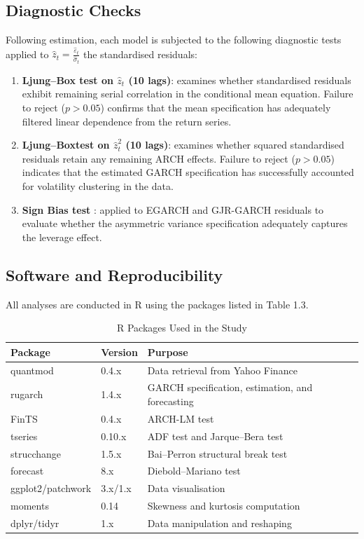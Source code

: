 \subsection{Diagnostic Checks}
Following estimation, each model is subjected to the following diagnostic tests applied to $
\hat{z}_t
=
\frac{\hat{\varepsilon}_t}{\hat{\sigma}_t}$
the standardised residuals:
\begin{enumerate}
    \item \textbf{Ljung–Box test on $\hat{z}_t$  (10 lags)}\cite{ljungbox1978}:  examines whether standardised 
residuals exhibit remaining serial correlation in the conditional mean equation. Failure to reject ($p > 0.05$) confirms that the mean specification has adequately filtered linear dependence from the return series.
    \item \textbf{Ljung–Boxtest on $\hat{z}^2_t$ (10 lags)}: examines whether squared standardised residuals retain any remaining ARCH 
effects. Failure to reject ($p > 0.05$) indicates that the estimated GARCH specification has successfully accounted for volatility clustering 
in the data.
    \item \textbf{Sign Bias test} \citep{engle1993}: applied to EGARCH and GJR-GARCH residuals to evaluate whether the asymmetric variance specification adequately captures the leverage effect.

\end{enumerate}

    \vspace{2cm}

\newpage

\subsection{Software and Reproducibility}
All analyses are conducted in R using the packages listed in Table 1.3.
\begin{table}[h]
\centering
\caption{R Packages Used in the Study}
\begin{tabular}{|l|l|l|}
\hline
\textbf{Package} & \textbf{Version} & \textbf{Purpose}  \\
\hline
  quantmod & 0.4.x & Data retrieval from Yahoo Finance  \\
\hline
  rugarch & 1.4.x & GARCH specification, estimation, and forecasting \\
\hline
  FinTS & 0.4.x & ARCH-LM test \\
\hline
  tseries & 0.10.x & ADF test and Jarque–Bera test \\
\hline
 strucchange & 1.5.x & Bai–Perron structural break test \\
\hline
 forecast &  8.x & Diebold–Mariano test\\
\hline
 ggplot2/patchwork  & 3.x/1.x & Data visualisation\\
\hline
 moments & 0.14 & Skewness and kurtosis computation \\
\hline
  dplyr/tidyr & 1.x  & Data manipulation and reshaping\\
\hline
\end{tabular}
\end{table}

